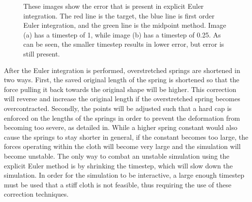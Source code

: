 \documentclass{thesis}
\begin{document}
\begin{figure}
\centering
{}
\caption[Euler integration]{These images show the error that is present in explicit Euler integration.  The red line is the target,
the blue line is first order Euler integration, and the green line is the midpoint method.  Image (a) has a timestep of 1,
while image (b) has a timestep of 0.25.  As can be seen, the smaller timestep results in lower error, but error is still present.}
\label{fig:euler_integration}
\end{figure}

After the Euler integration is performed, overstretched springs are shortened in two ways.  First, the saved original length of the
spring is shortened so that the force pulling it back towards the original shape will be higher.  This correction will reverse and
increase the original length if the overstretched spring becomes overcontracted.  Secondly, the points will be adjusted such that
a hard cap is enforced on the lengths of the springs in order to prevent the deformation from becoming too severe, as detailed
in\cite{provot95deformationconstraints}.  While a higher spring constant would also cause the springs to stay shorter in general,
if the constant becomes too large, the forces operating within the cloth will become very large and the simulation will become
unstable.  The only way to combat an unstable simulation using the explicit Euler method is by shrinking the timestep, which
will slow down the simulation.  In order for the simulation to be interactive, a large enough timestep must be used that a stiff
cloth is not feasible, thus requiring the use of these correction techniques.
\end{document}
